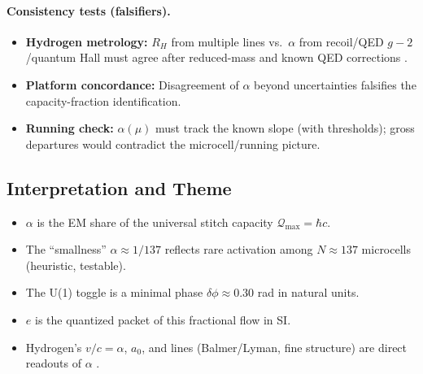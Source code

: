 \paragraph{Consistency tests (falsifiers).}
\begin{itemize}
  \item \textbf{Hydrogen metrology:} \(R_H\) from multiple lines vs.\ \(\alpha\) from recoil/QED \(g\!-\!2\)/quantum Hall must agree after reduced-mass and known QED corrections \cite{griffiths2018quantum,tiesinga2021codata}.
  \item \textbf{Platform concordance:} Disagreement of \(\alpha\) beyond uncertainties falsifies the capacity-fraction identification.
  \item \textbf{Running check:} \(\alpha(\mu)\) must track the known slope (with thresholds); gross departures would contradict the microcell/running picture.
\end{itemize}

\subsection*{Interpretation and Theme}
\begin{itemize}
  \item \(\alpha\) is the EM share of the universal stitch capacity \(\mathcal Q_{\max}=\hbar c\).
  \item The ``smallness'' \(\alpha\!\approx\!1/137\) reflects rare activation among \(N\!\approx\!137\) microcells (heuristic, testable).
  \item The U(1) toggle is a minimal phase \(\delta\phi\!\approx\!0.30\) rad in natural units.
  \item \(e\) is the quantized packet of this fractional flow in SI.
  \item Hydrogen's \(v/c=\alpha\), \(a_0\), and lines (Balmer/Lyman, fine structure) are direct readouts of \(\alpha\) \cite{bohr1913constitution,griffiths2018quantum}.
\end{itemize}

